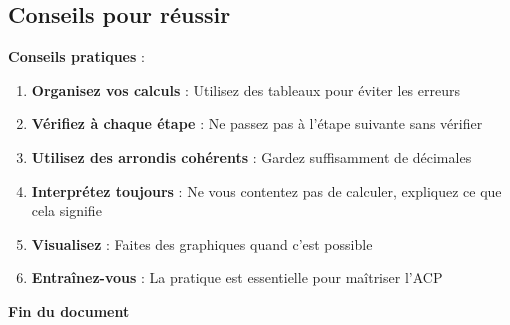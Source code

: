 \documentclass[11pt,a4paper]{article}
\begin{document}
\subsection{Conseils pour réussir}

\begin{conseilbox}
\textbf{Conseils pratiques} :
\begin{enumerate}
    \item \textbf{Organisez vos calculs} : Utilisez des tableaux pour éviter les erreurs
    \item \textbf{Vérifiez à chaque étape} : Ne passez pas à l'étape suivante sans vérifier
    \item \textbf{Utilisez des arrondis cohérents} : Gardez suffisamment de décimales
    \item \textbf{Interprétez toujours} : Ne vous contentez pas de calculer, expliquez ce que cela signifie
    \item \textbf{Visualisez} : Faites des graphiques quand c'est possible
    \item \textbf{Entraînez-vous} : La pratique est essentielle pour maîtriser l'ACP
\end{enumerate}
\end{conseilbox}

\vspace{2cm}

\begin{center}
\textbf{Fin du document}
\end{center}
\end{document}
